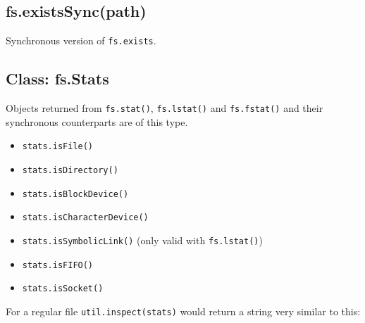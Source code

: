 \subsection{fs.existsSync(path)}

Synchronous version of \texttt{fs.exists}.

\subsection{Class: fs.Stats}

Objects returned from \texttt{fs.stat()}, \texttt{fs.lstat()} and
\texttt{fs.fstat()} and their synchronous counterparts are of this type.

\begin{itemize}
\item
  \texttt{stats.isFile()}
\item
  \texttt{stats.isDirectory()}
\item
  \texttt{stats.isBlockDevice()}
\item
  \texttt{stats.isCharacterDevice()}
\item
  \texttt{stats.isSymbolicLink()} (only valid with \texttt{fs.lstat()})
\item
  \texttt{stats.isFIFO()}
\item
  \texttt{stats.isSocket()}
\end{itemize}

For a regular file \texttt{util.inspect(stats)} would return a string
very similar to this:

\begin{Shaded}
\begin{Highlighting}[]
\NormalTok{\{ }\NormalTok{: }\NormalTok{,}
  \NormalTok{: }\NormalTok{,}
  \NormalTok{: }\NormalTok{,}
  \NormalTok{: }\NormalTok{,}
  \NormalTok{: }\NormalTok{,}
  \NormalTok{: }\NormalTok{,}
  \NormalTok{: }\NormalTok{,}
  \NormalTok{: }\NormalTok{,}
  \NormalTok{: }\NormalTok{,}
  \NormalTok{: }\NormalTok{,}
    \NormalTok{:}\NormalTok{:} 
    \NormalTok{:}\NormalTok{:} 
    \NormalTok{:}\NormalTok{:} 
    \NormalTok{:}\NormalTok{:} 
\end{Highlighting}
\end{Shaded}

